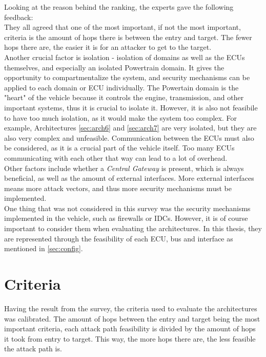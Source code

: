 Looking at the reason behind the ranking, the experts gave the following feedback:\\

They all agreed that one of the most important, if not the most important, criteria is the amount of hops there is between the entry and target.
The fewer hops there are, the easier it is for an attacker to get to the target.\\
Another crucial factor is isolation - isolation of domains as well as the ECUs themselves, and especially an isolated Powertrain domain.
It gives the opportunity to compartmentalize the system, and security mechanisms can be applied to each domain or ECU individually.
The Powertain domain is the "heart" of the vehicle because it controls the engine, transmission, and other important systems, thus it is crucial to isolate it.
However, it is also not feasibile to have too much isolation, as it would make the system too complex.
For example, Architectures \ref{sec:arch6} and \ref{sec:arch7} are very isolated, but they are also very complex and unfeasible.
Communication between the ECUs must also be considered, as it is a crucial part of the vehicle itself. 
Too many ECUs communicating with each other that way can lead to a lot of overhead.\\
Other factors include whether a \textit{Central Gateway} is present, which is always beneficial, as well as the amount of external interfaces.
More external interfaces means more attack vectors, and thus more security mechanisms must be implemented.\\

One thing that was not considered in this survey was the security mechanisms implemented in the vehicle, such as firewalls or IDCs.
However, it is of course important to consider them when evaluating the architectures. 
In this thesis, they are represented through the feasibility of each ECU, bus and interface as mentioned in \ref{sec:config}.


\section{Criteria}

Having the result from the survey, the criteria used to evaluate the architectures was calibrated.
The amount of hops between the entry and target being the most important criteria, each attack path feasibility is divided by the amount of hops it took from entry to target.
This way, the more hops there are, the less feasible the attack path is.
